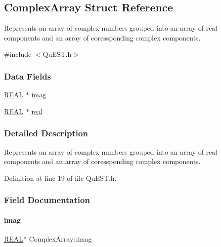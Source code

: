 \hypertarget{structComplexArray}{}\subsection{Complex\+Array Struct Reference}
\label{structComplexArray}


Represents an array of complex numbers grouped into an array of real components and an array of coressponding complex components.  




{\ttfamily \#include $<$Qu\+E\+S\+T.\+h$>$}

\subsubsection*{Data Fields}
\begin{DoxyCompactItemize}
\item 
\mbox{\hyperlink{QuEST__precision_8h_a4b654506f18b8bfd61ad2a29a7e38c25}{R\+E\+AL}} $\ast$ \mbox{\hyperlink{structComplexArray_a79dde47c7ae530c79cebfdf57b225968}{imag}}
\item 
\mbox{\hyperlink{QuEST__precision_8h_a4b654506f18b8bfd61ad2a29a7e38c25}{R\+E\+AL}} $\ast$ \mbox{\hyperlink{structComplexArray_a4195cac6c784ea1b6271f1c7dba1548a}{real}}
\end{DoxyCompactItemize}


\subsubsection{Detailed Description}
Represents an array of complex numbers grouped into an array of real components and an array of coressponding complex components. 

Definition at line 19 of file Qu\+E\+S\+T.\+h.



\subsubsection{Field Documentation}
\mbox{\label{structComplexArray_a79dde47c7ae530c79cebfdf57b225968}} 
\paragraph{\texorpdfstring{imag}{imag}}
{\footnotesize\ttfamily \mbox{\hyperlink{QuEST__precision_8h_a4b654506f18b8bfd61ad2a29a7e38c25}{R\+E\+AL}}$\ast$ Complex\+Array\+::imag}




